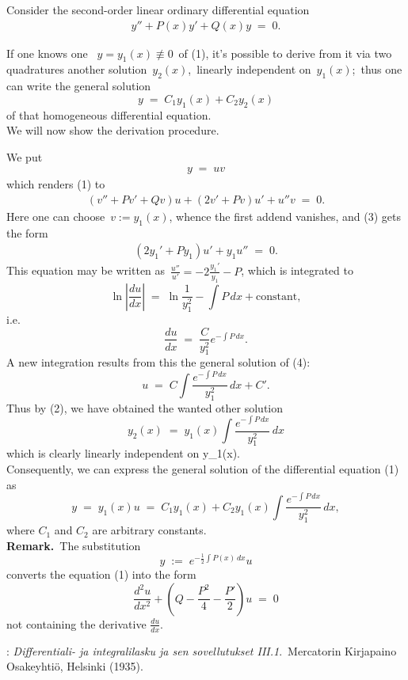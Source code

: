 \documentclass[12pt]{article}
\begin{document}
Consider the 
second-order linear ordinary differential equation
\begin{align}
      y''\!+\!P(x)y'\!+\!Q(x)y \;=\; 0.
\end{align}

If one knows one 
\, 
$y = y_1(x) \not\equiv 0$\, of (1), it's possible to derive 
from it via two quadratures another solution\, $y_2(x)$,\, 
linearly independent on\, $y_1(x)$;\, thus one can write the 
general solution
     $$y \;=\; C_1y_1(x)\!+\!C_2y_2(x)$$
of that homogeneous differential equation.\\

We will now show the derivation procedure.

We put
\begin{align}
     y \;=\; uv
\end{align}
which renders (1) to
\begin{align}
(v''+Pv'+Qv)u+(2v'+Pv)u'+u''v \;=\; 0.
\end{align}
Here one can choose\, $v := y_1(x)$, whence the first addend 
vanishes, and (3) gets the form
\begin{align}
(2y_1'+Py_1)u'+y_1u'' \;=\;0.
\end{align}
This equation may be written as\, $\frac{u''}{u'} = 
-2\frac{y_1'}{y_1}-P$, which is integrated to
     $$\ln\left|\frac{du}{dx}\right| 
     \;=\; \ln\frac{1}{y_1^2}-\int P\,dx+\mbox{constant},$$
i.e.
  $$\frac{du}{dx} \;=\; \frac{C}{y_1^2}e^{-\int P\,dx}.$$
A new integration results from this the general solution of (4):
   $$u \;=\; C\int\frac{e^{-\int P\,dx}}{y_1^2}\,dx+C'.$$
Thus by (2), we have obtained the wanted other solution
$$y_2(x) \;=\; y_1(x)\int\frac{e^{-\int P\,dx}}{y_1^2}\,dx$$
which is clearly linearly independent on y_1(x).\\

Consequently, we can express the general solution of the 
differential equation (1) as
  $$y \;=\; y_1(x)u 
  \;=\; C_1y_1(x)+C_2y_1(x)\int\frac{e^{-\int P\,dx}}{y_1^2}\,dx,$$
where $C_1$ and $C_2$ are arbitrary constants.\\

\textbf{Remark.}\, The substitution 
$$y \;:=\; e^{-\frac{1}{2}\int P(x)\,dx}u$$
converts the equation (1) into the form
$$\frac{d^2u}{dx^2}+(Q-\frac{P^2}{4}-\frac{P'}{2})u \;=\;0$$
not containing the derivative $\frac{du}{dx}$.


\begin{thebibliography}{8}
: {\em Differentiali- ja integralilasku
ja sen sovellutukset III.1}.\, Mercatorin Kirjapaino Osakeyhti\"o, Helsinki (1935).
\end{thebibliography}
\end{document}
